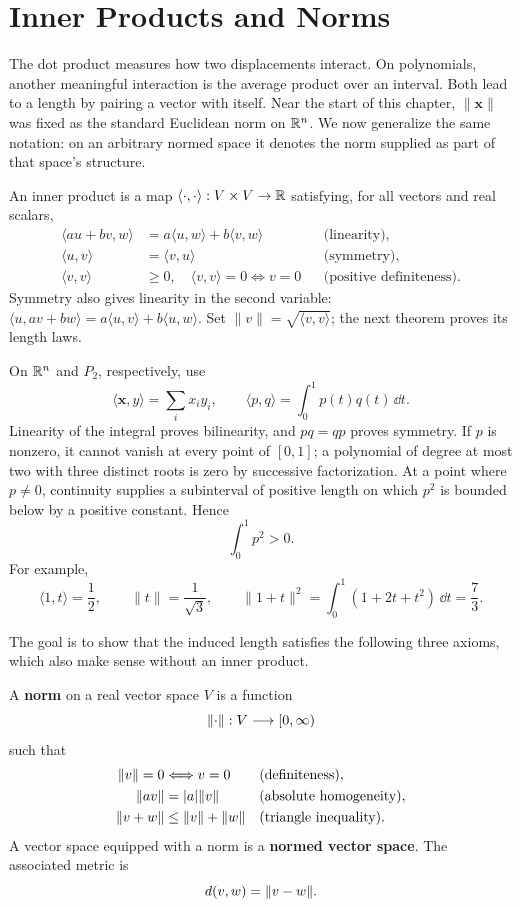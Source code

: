 \section{Inner Products and Norms}
The dot product measures how two displacements interact. On polynomials,
another meaningful interaction is the average product over an interval.
Both lead to a length by pairing a vector with itself.
Near the start of this chapter, $\|\mathbf{x}\|$ was fixed as the standard Euclidean
norm on $\mathbb{R}^n$. We now generalize the same notation: on an arbitrary normed
space it denotes the norm supplied as part of that space's structure.
\begin{definition}
An inner product is a map $\langle\cdot,\cdot\rangle:V\times V\to\mathbb{R}$
satisfying, for all vectors and real scalars,
\begin{align*}
\langle au+bv,w\rangle&=a\langle u,w\rangle+b\langle v,w\rangle &&\text{(linearity)},\\
\langle u,v\rangle&=\langle v,u\rangle &&\text{(symmetry)},\\
\langle v,v\rangle&\geq0,\quad \langle v,v\rangle=0\Longleftrightarrow v=0
&&\text{(positive definiteness)}.
\end{align*}
Symmetry also gives linearity in the second variable:
$\langle u,av+bw\rangle=a\langle u,v\rangle+b\langle u,w\rangle$.
Set $\|v\|=\sqrt{\langle v,v\rangle}$; the next theorem proves its length laws.

\end{definition}
\begin{example}
On $\mathbb{R}^n$ and $P_2$, respectively, use
\[
\langle \mathbf{x},y\rangle=\sum_i x_i y_i,
\qquad
\langle p,q\rangle=\int_0^1p(t)q(t)\,\dd t.
\]
Linearity of the integral proves bilinearity, and $pq=qp$ proves symmetry.
If $p$ is nonzero, it cannot vanish at every point of $[0,1]$;
a polynomial of degree at most two with three distinct roots is zero by
successive factorization. At a point where $p\ne0$, continuity supplies
a subinterval of positive length on which $p^2$ is bounded below by a
positive constant. Hence
\[
\int_0^1p^2>0.
\]
 For example,
\[
\langle1,t\rangle=\frac12,
\qquad
\|t\|=\frac1{\sqrt3},
\qquad
\|1+t\|^2=\int_0^1(1+2t+t^2)\,\dd t=\frac73.
\]
\end{example}
The goal is to show that the induced length satisfies the following
three axioms, which also make sense without an inner product.
\begin{definition}[Norm]
A \textbf{norm} on a real vector space $V$ is a function
\[
\lVert \cdot\rVert:V\longrightarrow[0,\infty)
\]
such that
\[
\begin{aligned}
\lVert v\rVert=0&\Longleftrightarrow v=0 &&\text{(definiteness)},\\
\lVert av\rVert&=\lvert a\rvert\lVert v\rVert &&\text{(absolute homogeneity)},\\
\lVert v+w\rVert&\leq\lVert v\rVert+\lVert w\rVert &&\text{(triangle inequality)}.
\end{aligned}
\]
A vector space equipped with a norm is a \textbf{normed vector space}.
The associated metric is
\[
d(v,w)=\lVert v-w\rVert.
\]
\end{definition}
